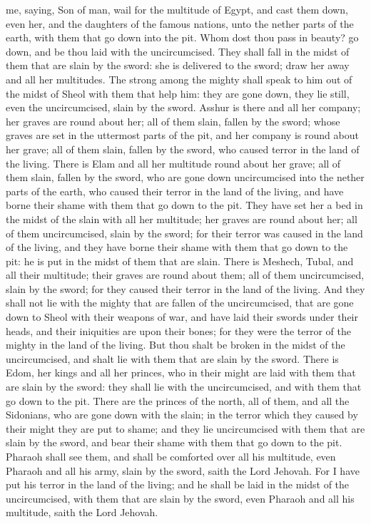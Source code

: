 me, saying, Son of man, wail for the multitude of Egypt, and cast them down, even her, and the daughters of the famous nations, unto the nether parts of the earth, with them that go down into the pit. Whom dost thou pass in beauty? go down, and be thou laid with the uncircumcised. They shall fall in the midst of them that are slain by the sword: she is delivered to the sword; draw her away and all her multitudes. The strong among the mighty shall speak to him out of the midst of Sheol with them that help him: they are gone down, they lie still, even the uncircumcised, slain by the sword.  Asshur is there and all her company; her graves are round about her; all of them slain, fallen by the sword; whose graves are set in the uttermost parts of the pit, and her company is round about her grave; all of them slain, fallen by the sword, who caused terror in the land of the living.  There is Elam and all her multitude round about her grave; all of them slain, fallen by the sword, who are gone down uncircumcised into the nether parts of the earth, who caused their terror in the land of the living, and have borne their shame with them that go down to the pit. They have set her a bed in the midst of the slain with all her multitude; her graves are round about her; all of them uncircumcised, slain by the sword; for their terror was caused in the land of the living, and they have borne their shame with them that go down to the pit: he is put in the midst of them that are slain.  There is Meshech, Tubal, and all their multitude; their graves are round about them; all of them uncircumcised, slain by the sword; for they caused their terror in the land of the living. And they shall not lie with the mighty that are fallen of the uncircumcised, that are gone down to Sheol with their weapons of war, and have laid their swords under their heads, and their iniquities are upon their bones; for they were the terror of the mighty in the land of the living. But thou shalt be broken in the midst of the uncircumcised, and shalt lie with them that are slain by the sword.  There is Edom, her kings and all her princes, who in their might are laid with them that are slain by the sword: they shall lie with the uncircumcised, and with them that go down to the pit. There are the princes of the north, all of them, and all the Sidonians, who are gone down with the slain; in the terror which they caused by their might they are put to shame; and they lie uncircumcised with them that are slain by the sword, and bear their shame with them that go down to the pit.  Pharaoh shall see them, and shall be comforted over all his multitude, even Pharaoh and all his army, slain by the sword, saith the Lord Jehovah. For I have put his terror in the land of the living; and he shall be laid in the midst of the uncircumcised, with them that are slain by the sword, even Pharaoh and all his multitude, saith the Lord Jehovah. 

